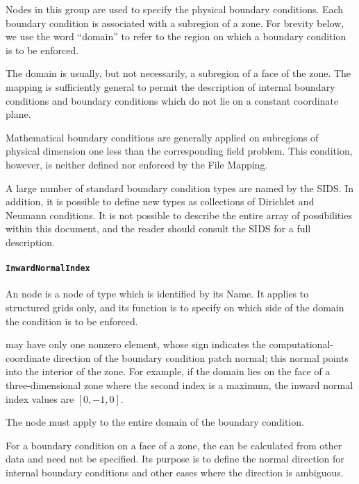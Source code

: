 Nodes in this group are used to specify the physical boundary
conditions. Each boundary condition is associated with a subregion of
a zone. For brevity below, we use the word ``domain'' to refer to the
region on which a boundary condition is to be enforced.

The domain is usually, but not necessarily, a subregion of a face of the
zone. The mapping is sufficiently general to permit the description of
internal boundary conditions and boundary conditions which do not lie on
a constant coordinate plane.

Mathematical boundary conditions are generally applied on subregions of
physical dimension one less than the corresponding field problem. This
condition, however, is neither defined nor enforced by the File Mapping.

A large number of standard boundary condition types are named by the
SIDS. In addition, it is possible to define new types as collections
of Dirichlet and Neumann conditions. It is not possible to describe
the entire array of possibilities within this document, and the reader
should consult the SIDS for a full description.

\paragraph{\texttt{InwardNormalIndex}}

An  node is a node of type
 which is identified by its Name.
It applies to structured grids only, and its function is to specify on
which side of the domain the condition is to be enforced.

 may have only one nonzero element, whose
sign indicates the computational-coordinate direction of the boundary
condition patch normal; this normal points into the interior of the zone.
For example, if the domain lies on the face of a three-dimensional zone
where the second index is a maximum, the inward normal index values are
$[0,-1,0]$.

The  node must apply to the entire domain
of the boundary condition.

For a boundary condition on a face of a zone, the
 can be calculated from other data and need not
be specified. Its purpose is to define the normal direction for internal
boundary conditions and other cases where the direction is ambiguous.

